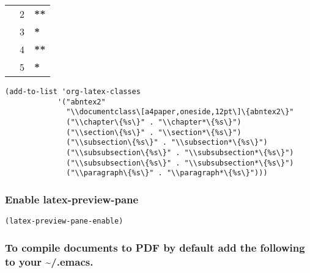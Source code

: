 \documentclass[11pt]{article}
\begin{document}
\begin{itemize}
\begin{center}
\begin{tabular}{lrl}
\subsection & 2 & \textbf{**}\\
\subsubsection & 3 & \textbf{\textbf{*}}\\
\paragraph & 4 & \textbf{\textbf{**}}\\
\subparagraph & 5 & \textbf{\textbf{\textbf{*}}}\\
\end{tabular}
\end{center}
\begin{verbatim}
(add-to-list 'org-latex-classes
            '("abntex2"
              "\\documentclass\[a4paper,oneside,12pt\]\{abntex2\}"
              ("\\chapter\{%s\}" . "\\chapter*\{%s\}")
              ("\\section\{%s\}" . "\\section*\{%s\}")
              ("\\subsection\{%s\}" . "\\subsection*\{%s\}")
              ("\\subsubsection\{%s\}" . "\\subsubsection*\{%s\}")
              ("\\subsubsection\{%s\}" . "\\subsubsection*\{%s\}")
              ("\\paragraph\{%s\}" . "\\paragraph*\{%s\}")))
\end{verbatim}
\end{itemize}


\subsubsection*{Enable latex-preview-pane}
\label{sec:org7e98401}
\begin{verbatim}
(latex-preview-pane-enable)
\end{verbatim}

\subsubsection*{To compile documents to PDF by default add the following to your \textasciitilde{}/.emacs.}
\label{sec:org7122be2}
\end{document}
